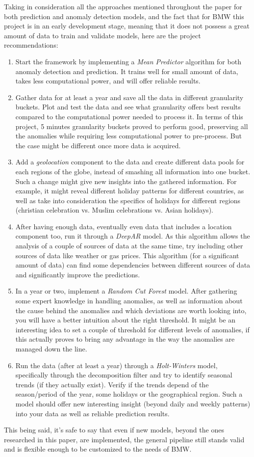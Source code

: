Taking in consideration all the approaches mentioned throughout the paper for both prediction and anomaly detection models, and the fact that for BMW this project is in an early development stage, meaning that it does not possess a great amount of data to train and validate models, here are the project recommendations:
\begin{enumerate}
    \item Start the framework by implementing a \textit{Mean Predictor} algorithm for both anomaly detection and prediction. It trains well for small amount of data, takes less computational power, and will offer reliable results.
    \item Gather data for at least a year and save all the data in different granularity buckets. Plot and test the data and see what granularity offers best results compared to the computational power needed to process it. In terms of this project, 5 minutes granularity buckets proved to perform good, preserving all the anomalies while requiring less computational power to pre-process. But the case might be different once more data is acquired.
    \item Add a \textit{geolocation} component to the data and create different data pools for each regions of the globe, instead of smashing all information into one bucket. Such a change might give new insights into the gathered information. For example, it might reveal different holiday patterns for different countries, as well as take into consideration the specifics of holidays for different regions (christian celebration vs. Muslim celebrations vs. Asian holidays).  
    \item After having enough data, eventually even data that includes a location component too, run it through a \textit{DeepAR} model. As this algorithm allows the analysis of a couple of sources of data at the same time, try including other sources of data like weather or gas prices. This algorithm (for a significant amount of data) can find some dependencies between different sources of data and significantly improve the predictions.
    \item In a year or two, implement a \textit{Random Cut Forest} model. After gathering some expert knowledge in handling anomalies, as well as information about the cause behind the anomalies and which deviations are worth looking into, you will have a better intuition about the right threshold. It might be an interesting idea to set a couple of threshold for different levels of anomalies, if this actually proves to bring any advantage in the way the anomalies are managed down the line.
    \item Run the data (after at least a year) through a \textit{Holt-Winters} model, specifically through the decomposition filter and try to identify seasonal trends (if they actually exist). Verify if the trends depend of the season/period of the year, some holidays or the geographical region. Such a model should offer new interesting insight (beyond daily and weekly patterns) into your data as well as reliable prediction results.
\end{enumerate}
This being said, it's safe to say that even if new models, beyond the ones researched in this paper, are implemented, the general pipeline still stands valid and is flexible enough to be customized to the needs of BMW. 